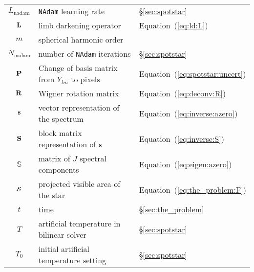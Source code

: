 \documentclass[modern]{aastex62}
\begin{document}
\begin{center}
\begin{longtable}{cll}
        $L_\mathrm{nadam}$                                  & \texttt{NAdam} learning rate                                 & \S\ref{sec:spotstar}                       \\
        ${\mathbf{L}}$                                          & limb darkening operator                                      & Equation~(\ref{eq:ld:L})                   \\
        $m$                                                 & spherical harmonic order                                     &                                            \\
        $N_\mathrm{nadam}$                                  & number of \texttt{NAdam} iterations                          & \S\ref{sec:spotstar}                       \\
        ${\mathbf{P}}$                                          & Change of basis matrix from $Y_{lm}$ to pixels               & Equation~(\ref{eq:spotstar:uncert})        \\
        ${\mathbf{R}}$                                          & Wigner rotation matrix                                       & Equation~(\ref{eq:deconv:R})               \\
        ${\mathbf{s}}$                                          & vector representation of the spectrum                        & Equation~(\ref{eq:inverse:azero})          \\
        ${\mathbf{S}}$                                          & block matrix representation of ${\mathbf{s}}$                    & Equation~(\ref{eq:inverse:S})              \\
        $\boldsymbol{\mathbb{S}}$                           & matrix of $J$ spectral components                            & Equation~(\ref{eq:eigen:azero})            \\
        $\mathcal{S}$                                             & projected visible area of the star                           & Equation~(\ref{eq:the_problem:F})          \\
        $t$                                                 & time                                                         & \S\ref{sec:the_problem}                    \\
        $T$                                                 & artificial temperature in bilinear solver                    & \S\ref{sec:spotstar}                       \\
        $T_0$                                               & initial artificial temperature setting                       & \S\ref{sec:spotstar}                       \\

\end{longtable}
\end{center}
\end{document}

